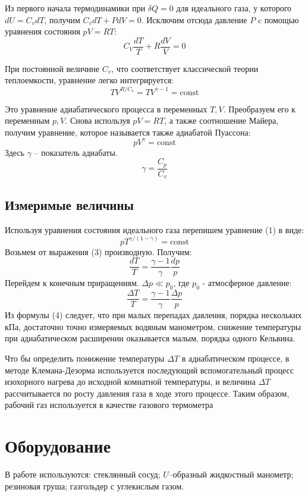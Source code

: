 \documentclass[a4paper,12pt]{article}
\theoremstyle{plain} %
\theoremstyle{definition} %
\theoremstyle{remark} %
\begin{document}
	Из первого начала термодинамики при $\delta Q = 0$ для идеального газа, у которого $dU = C_v dT$, получим $C_v dT + P dV = 0$. Исключим отсюда давление $P$ c помощью уравнения состояния $pV = RT$:
	\[C_V\frac{dT}{T}+R\frac{dV}{V} = 0 \]
	
	При постоянной величине $C_v$, что соответствует классической теории теплоемкости, уравнение легко интегрируется:
	\[TV^{R/C_v} = TV^{\gamma - 1} = \text{const} \]
	
	Это уравнение адиабатического процесса в переменных $T, V$. Преобразуем его к переменным $p, V$. Снова используя $pV = RT$, а также соотношение Майера, получим уравнение, которое называется также адиабатой Пуассона:
	\begin{equation}
	pV^{\gamma} = \text{const}
	\end{equation}
	Здесь $\gamma$ -- показатель адиабаты.
	\begin{equation}
	\gamma = \frac{C_p}{C_v}
	\end{equation}
	
	\subsection{Измеримые величины}
	Используя уравнения состояния идеального газа перепишем уравнение (1) в виде:
	\begin{equation}
	pT^{\gamma/(1-\gamma)} = \text{const}
	\end{equation}
	Возьмем от выражения (3) производную. Получим:
	\[\frac{dT}{T} = \frac{\gamma - 1}{\gamma}\frac {dp}{p} \]
	Перейдем к конечным приращениям. $\Delta p \ll p_0$, где $p_0$ - атмосферное давление:
	\begin{equation}
	\frac{\Delta T}{T} = \frac{\gamma - 1}{\gamma}\frac {\Delta p}{p}
	\end{equation}
	Из формулы (4) следует, что при малых перепадах давления, порядка нескольких кПа, достаточно точно измеряемых водяным манометром, снижение температуры при адиабатическом расширении оказывается малым, порядка одного Кельвина.
	
	Что бы определить понижение температуры $\Delta T$ в адиабатическом процессе, в методе Клемана-Дезорма используется последующий вспомогательный процесс изохорного нагрева до исходной комнатной температуры, и величина  $\Delta T$ рассчитывается по росту давления газа в ходе этого процессе. Таким образом, рабочий газ используется в качестве газового термометра
	
	\section{Оборудование}
	В работе используются: стеклянный сосуд; $U$--образный жидкостный манометр; резиновая груша; газгольдер с углекислым газом.
\end{document}
